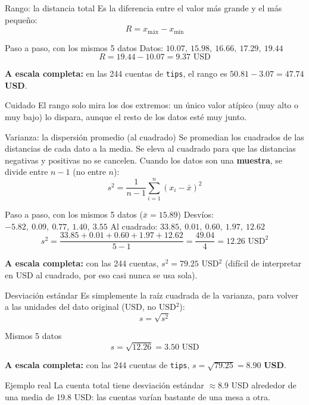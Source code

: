 \documentclass[aspectratio=169,11pt]{beamer}
\begin{document}
\begin{frame}{Rango: la distancia total}
  \small
  Es la diferencia entre el valor más grande y el más pequeño:
  \[
    R = x_{\text{máx}} - x_{\text{mín}}
  \]
  \begin{exampleblock}{\small Paso a paso, con los mismos 5 datos}
    \small Datos: $10.07,\ 15.98,\ 16.66,\ 17.29,\ 19.44$
    \[
      R = 19.44 - 10.07 = 9.37 \text{ USD}
    \]
  \end{exampleblock}
  \small \textbf{A escala completa:} en las 244 cuentas de \texttt{tips},
  el rango es $50.81 - 3.07 = \mathbf{47.74}$ \textbf{USD}.
  \begin{alertblock}{Cuidado}
    \small El rango solo mira los dos extremos: un único valor atípico
    (muy alto o muy bajo) lo dispara, aunque el resto de los datos esté
    muy junto.
  \end{alertblock}
\end{frame}

\begin{frame}{Varianza: la dispersión promedio (al cuadrado)}
  \small
  Se promedian los cuadrados de las distancias de cada dato a la media.
  Se eleva al cuadrado para que las distancias negativas y positivas no se
  cancelen. Cuando los datos son una \textbf{muestra}, se divide entre
  $n-1$ (no entre $n$):
  \[
    s^2 = \frac{1}{n-1}\sum_{i=1}^n (x_i - \bar{x})^2
  \]
  \begin{exampleblock}{\small Paso a paso, con los mismos 5 datos ($\bar{x}=15.89$)}
    \small
    Desvíos: $-5.82,\ 0.09,\ 0.77,\ 1.40,\ 3.55$ \quad
    Al cuadrado: $33.85,\ 0.01,\ 0.60,\ 1.97,\ 12.62$
    \[
      s^2 = \frac{33.85+0.01+0.60+1.97+12.62}{5-1} = \frac{49.04}{4} = 12.26 \text{ USD}^2
    \]
  \end{exampleblock}
  \small \textbf{A escala completa:} con las 244 cuentas, $s^2 = 79.25$
  USD$^2$ (difícil de interpretar en USD al cuadrado, por eso casi nunca se
  usa sola).
\end{frame}

\begin{frame}{Desviación estándar}
  \small
  Es simplemente la raíz cuadrada de la varianza, para volver a las
  unidades del dato original (USD, no USD$^2$):
  \[
    s = \sqrt{s^2}
  \]
  \begin{exampleblock}{\small Mismos 5 datos}
    \small
    \[
      s = \sqrt{12.26} = 3.50 \text{ USD}
    \]
  \end{exampleblock}
  \small \textbf{A escala completa:} con las 244 cuentas de \texttt{tips},
  $s = \sqrt{79.25} = \mathbf{8.90}$ \textbf{USD}.
  \begin{exampleblock}{Ejemplo real}
    \small La cuenta total tiene desviación estándar $\approx 8.9$ USD
    alrededor de una media de 19.8 USD: las cuentas varían bastante de una
    mesa a otra.
  \end{exampleblock}
\end{frame}
\end{document}
